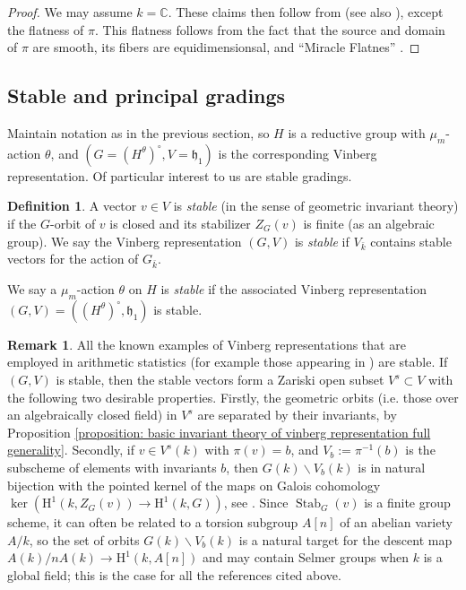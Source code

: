 \documentclass{article} %
\numberwithin{equation}{section}
\theoremstyle{definition}
\newtheorem{definition}[proposition]{Definition}
\newtheorem{remark}[proposition]{Remark}
\DeclareMathOperator{\Stab}{Stab}
\newcommand{\HH}{\mathrm{H}}
\newcommand{\frakh}{\mathfrak h}
\begin{document}
\begin{proof}
We may assume $k=\mathbb{C}$.
These claims then follow from \cite[Sections 2,4]{Vinberg-theweylgroupofgraded} (see also \cite[Theorem 1.1]{Panyushev-Invarianttheorythetagroups}), except the flatness of $\pi$.
This flatness follows from the fact that the source and domain of $\pi$ are smooth, its fibers are equidimensionsal, and ``Miracle Flatnes'' \cite[Theorem 23.1]{Matsumura-CommutativeRingTheory}.
\end{proof}




\subsection{Stable and principal gradings}\label{subsec: stable gradings over algebraically closed field}

Maintain notation as in the previous section, so $H$ is a reductive group with $\mu_m$-action $\theta$, and $(G = (H^\theta)^\circ, V = \frakh_1)$ is the corresponding Vinberg representation. Of particular interest to us are stable gradings.


\begin{definition}\label{definition: stable gradings}
A vector $v \in V$ is \emph{stable} (in the sense of geometric invariant theory) if the $G$-orbit of $v$ is closed and its stabilizer $Z_G(v)$ is finite (as an algebraic group).
We say the Vinberg representation $(G,V)$ is \emph{stable} if $V_{\bar{k}}$ contains stable vectors for the action of $G_{\bar{k}}$. 
\end{definition}


We say a $\mu_m$-action $\theta$ on $H$ is \emph{stable} if the associated Vinberg representation $(G,V) = ((H^{\theta})^{\circ},\frakh_1)$ is stable.

\begin{remark}
    All the known examples of Vinberg representations that are employed in arithmetic statistics (for example those appearing in \cite{BhargavaHo-2Selmergroupsofsomefamilies, BS-4Selmer, BS-5Selmer, Bhargava-Gross-hyperellcurves}) are stable.
    If $(G,V)$ is stable, then the stable vectors form a Zariski open subset $V^s\subset V$ with the following two desirable properties.
    Firstly, the geometric orbits (i.e. those over an algebraically closed field) in $V^s$ are separated by their invariants, by Proposition \ref{proposition: basic invariant theory of vinberg representation full generality}.
    Secondly, if $v\in V^s(k)$ with $\pi(v) = b$, and $V_b:= \pi^{-1}(b)$
 is the subscheme of elements with invariants $b$, then $G(k)\backslash V_b(k)$ is in natural bijection with the pointed kernel of the maps on Galois cohomology $\ker(\HH^1(k, Z_G(v)) \rightarrow \HH^1(k,G))$, see \cite[Section 2, Proposition 1]{BhargavaGross-AIT}. 
    Since $\Stab_G(v)$ is a finite group scheme, it can often be related to a torsion subgroup $A[n]$ of an abelian variety $A/k$, so the set of orbits $G(k)\backslash V_b(k)$ is a natural target for the descent map $A(k)/nA(k)\rightarrow \HH^1(k,A[n])$ and may contain Selmer groups when $k$ is a global field; this is the case for all the references cited above.
\end{remark}
\end{document}
